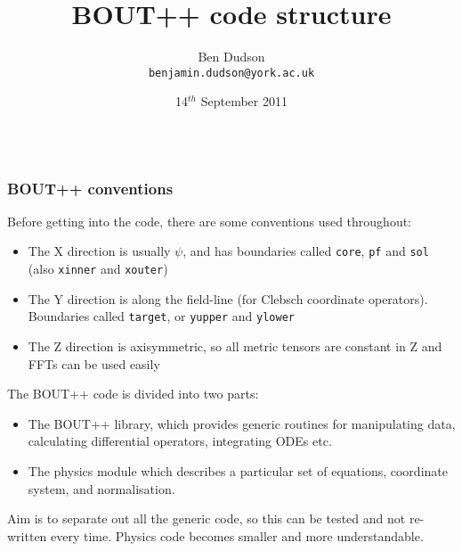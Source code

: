 \documentclass{beamer}
\begin{document}
\title[BOUT++ code structure (\insertframenumber\ of \inserttotalframenumber)]{BOUT++ code structure}
\author[B. D. Dudson, University of York]{Ben Dudson\\
\texttt{benjamin.dudson@york.ac.uk}}

\date{14$^{th}$ September 2011\\
\\
}
\begin{frame}
\titlepage
\end{frame}

\begin{frame}
  \frametitle{BOUT++ conventions}
  
  Before getting into the code, there are some conventions used throughout:
  \begin{itemize}
  \item The X direction is usually $\psi$, and has boundaries called \texttt{core}, \texttt{pf} and \texttt{sol} (also \texttt{xinner} and \texttt{xouter})
  \item The Y direction is along the field-line (for Clebsch coordinate
    operators). Boundaries called \texttt{target}, or \texttt{yupper} and \texttt{ylower}
  \item The Z direction is axisymmetric, so all metric tensors are constant in Z and FFTs can be used easily
  \end{itemize}
  
  \pause
  
  The BOUT++ code is divided into two parts:
  \begin{itemize}
  \item The BOUT++ library, which provides generic routines for manipulating
    data, calculating differential operators, integrating ODEs etc. 
  \item The physics module which describes a particular set of equations,
    coordinate system, and normalisation.
  \end{itemize}
  
  Aim is to separate out all the generic code, so this can be
  tested and not re-written every time. Physics code becomes
  smaller and more understandable.
\end{frame}
\end{document}
